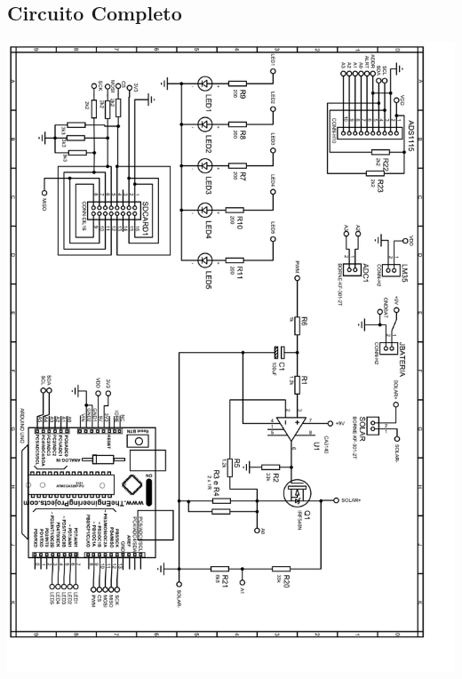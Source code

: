 

\begin{apendicesenv}
\partapendices

	\chapter{Circuito Completo}
	\label{Anx1}
		\includegraphics[scale=0.4]{PDFs/AllComponents-rotated-1.png}

\end{apendicesenv}
